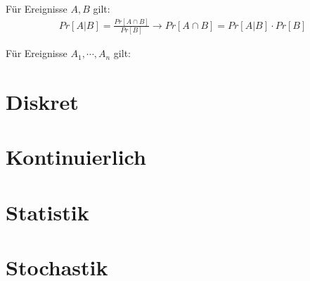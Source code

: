 \begin{satz}
	Für Ereignisse $A,B$ gilt:
	\begin{align*}
		Pr[A | B] = \frac{Pr[A \cap B]}{Pr[B]} \rightarrow Pr[A \cap B] = Pr [A | B] \cdot Pr[B]
	\end{align*}
\end{satz}

\begin{satz}[Multiplikationssatz]
	Für Ereignisse $A_1, \cdots, A_n$ gilt:

\end{satz}


\pagebreak
	
\section{Diskret}

\pagebreak

\section{Kontinuierlich}

\pagebreak

\section{Statistik}

\pagebreak

\section{Stochastik}

\pagebreak